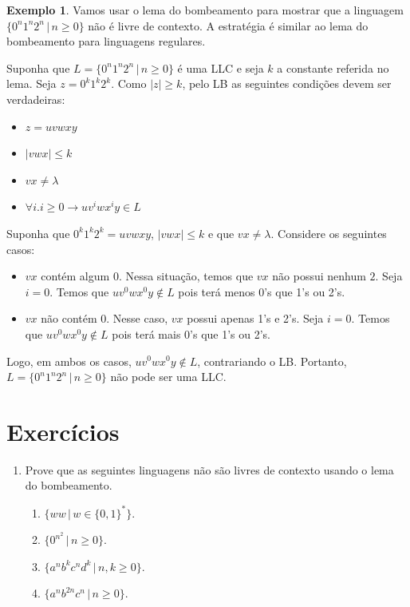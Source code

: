 \documentclass[a4paper]{article}
\theoremstyle{definition}
\newtheorem{Example}{Exemplo}
\begin{document}
  \begin{Example}
    Vamos usar o lema do bombeamento para mostrar que a linguagem
    $\{0^n1^n2^n\,|\,n\geq 0\}$ não é livre de contexto. A estratégia é similar
    ao lema do bombeamento para linguagens regulares.

    Suponha que $L = \{0^n1^n2^n\,|\,n\geq 0\}$ é uma LLC e seja $k$ a
    constante referida no lema. Seja $z = 0^k1^k2^k$. Como $|z|\geq k$, pelo LB
    as seguintes condições devem ser verdadeiras:
    \begin{itemize}
      \item $z = uvwxy$
      \item $|vwx| \leq k$
      \item $vx \neq \lambda$
      \item $\forall i. i \geq 0 \to uv^iwx^iy \in L$
    \end{itemize}
    Suponha que $0^k1^k2^k = uvwxy$, $|vwx| \leq k$ e que $vx \neq \lambda$.
    Considere os seguintes casos:
    \begin{itemize}
      \item $vx$ contém algum $0$. Nessa situação, temos que $vx$ não possui
        nenhum $2$. Seja $ i= 0$. Temos que $uv^0wx^0y \not\in L$ pois terá
        menos 0's que 1's ou 2's.
      \item $vx$ não contém $0$. Nesse caso, $vx$ possui apenas 1's e 2's. Seja
        $i = 0$. Temos que $uv^0wx^0y \not\in L$ pois terá
        mais 0's que 1's ou 2's.
      \end{itemize}
      Logo, em ambos os casos, $uv^0wx^0y \not\in L$, contrariando o LB.
      Portanto, $L = \{0^n1^n2^n\,|\,n\geq 0\}$ não pode ser uma LLC.
  \end{Example}
  
  \section{Exercícios} 

  \begin{enumerate}
     \item Prove que as seguintes linguagens não são livres de contexto usando
       o lema do bombeamento.
       \begin{enumerate}
          \item $\{ww\,|\,w \in\{0,1\}^*\}$.
          \item $\{0^{n^2}\,|\,n\geq 0\}$.
          \item $\{a^nb^kc^nd^k\,|\,n,k\geq 0\}$.
          \item $\{a^nb^{2n}c^n\,|\,n\geq 0\}$.
       \end{enumerate}
  \end{enumerate}
\end{document}
